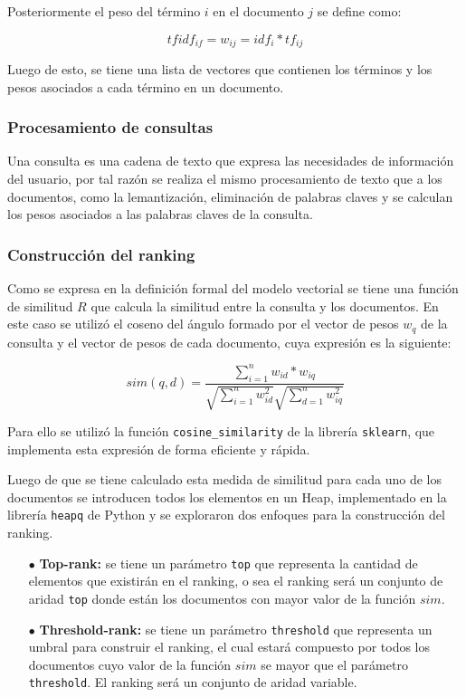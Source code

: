 Posteriormente el peso del término $i$ en el documento $j$ se define como:

$$ tfidf_{if} = w_{ij} = idf_i * tf_{ij} $$

Luego de esto, se tiene una lista de vectores que contienen los términos y los pesos asociados a cada término en un documento.

\subsubsection{Procesamiento de consultas}

Una consulta es una cadena de texto que expresa las necesidades de información del usuario, por tal razón se realiza el mismo procesamiento de texto que a los documentos, como la lemantización, eliminación de palabras claves y se calculan los pesos asociados a las palabras claves de la consulta.

\subsubsection{Construcción del ranking}

Como se expresa en la definición formal del modelo vectorial se tiene una función de similitud $R$ que calcula la similitud entre la consulta y los documentos. En este caso se utilizó el coseno del ángulo formado por el vector de pesos $w_q$ de la consulta y el vector de pesos de cada documento, cuya expresión es la siguiente:

$$ sim(q, d) = \frac{\sum_{i = 1}^n w_{id} * w_{iq}}{\sqrt{\sum_{i=1}^n w_{id}^2} \sqrt{\sum_{d=1}^n w_{iq}^2}} $$

Para ello se utilizó la función \verb|cosine_similarity| \cite{cos} de la librería \verb|sklearn|, que implementa esta expresión de forma eficiente y rápida.

Luego de que se tiene calculado esta medida de similitud para cada uno de los documentos se introducen todos los elementos en un Heap, implementado en la librería \verb|heapq| de Python y se exploraron dos enfoques para la construcción del ranking.

\begin{enumerate}
    \item[$\bullet$] \textbf{Top-rank:} se tiene un parámetro \verb|top| que representa la cantidad de elementos que existirán en el ranking, o sea el ranking será un conjunto de aridad \verb|top| donde están los documentos con mayor valor de la función $sim$.
    \item[$\bullet$] \textbf{Threshold-rank:} se tiene un parámetro \verb|threshold| que representa un umbral para construir el ranking, el cual estará compuesto por todos los documentos cuyo valor de la función $sim$ se mayor que el parámetro \verb|threshold|. El ranking será un conjunto de aridad variable. 
\end{enumerate}

